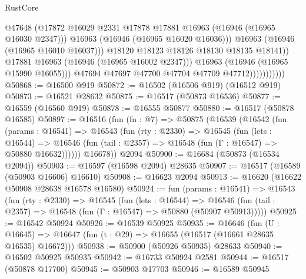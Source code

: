 \begin{lexlean}{RustCore}
\begin{coremodule}
                                      @47648
                                      (@17872
                                        @16029
                                        @2331
                                        @17878
                                        @17881
                                        @16963
                                        (@16946 (@16965 @16030 @2347)))
                                      @16963
                                      (@16946 (@16965 @16020 @16036)))
                                    @16963
                                    (@16946 (@16965 @16010 @16037)))
                                  @18120
                                  @18123
                                  @18126
                                  @18130
                                  @18135
                                  @18141))
                              @17881
                              @16963
                              (@16946 (@16965 @16002 @2347)))
                            @16963
                            (@16946 (@16965 @15990 @16055)))
                          @47694
                          @47697
                          @47700
                          @47704
                          @47709
                          @47712)))))))))))
@50868 := @16500 @919
@50872 := @16502 (@16506 @919) (@16512 @919)
@50873 := @16521 @28632
@50875 := @16517 (@50873 @16536)
@50877 := @16559 (@16560 @919)
@50878 := @16555 @50877
@50880 := @16517 (@50878 @16585)
@50897 := @16516
    (fun (fn : @7) =>
    @50875
      (@16539
        (@16542
          (fun (params : @16541) =>
          @16543
            (fun (rty : @2330) =>
            @16545
              (fun (lets : @16544) =>
              @16546 (fun (tail : @2357) => @16548 (fun (Γ : @16547) => @50880 @16632))))))
        @16678))
    @2094
@50900 := @16684 (@50873 (@16534 @2094))
@50903 := @16597 (@16598 @2094) @28635
@50907 := @16517 (@16589 (@50903 @16606) @16610)
@50908 := @16623 @2094
@50913 := @16620 (@16622 @50908 @28638 @16578 @16580)
@50924 := fun (params : @16541) =>
  @16543
    (fun (rty : @2330) =>
    @16545
      (fun (lets : @16544) =>
      @16546 (fun (tail : @2357) => @16548 (fun (Γ : @16547) => @50880 (@50907 @50913)))))
@50925 := @16542 @50924
@50926 := @16539 @50925
@50935 := @16646
    (fun (U : @16645) => @16647 (fun (t : @29) => @16655 (@16517 (@16661 @28635 @16535) @16672)))
@50938 := @50900 (@50926 @50935) @28633
@50940 := @16502 @50925 @50935
@50942 := @16733 @50924 @2581
@50944 := @16517 (@50878 @17700)
@50945 := @50903 @17703
@50946 := @16589 @50945

\end{coremodule}
\end{lexlean}
